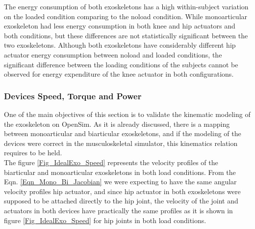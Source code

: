 \documentclass[10pt,letterpaper]{article}
\begin{document}
The energy consumption of both exoskeletons has a high within-subject variation on the loaded condition comparing to the noload condition. While monoarticular exoskeleton had less energy consumption in both knee and hip actuators and both conditions, but these differences are not statistically significant between the two exoskeletons.  Although both exoskeletons have considerably different hip actuator energy consumption between noload and loaded conditions, the significant difference between the loading conditions of the subjects cannot be observed for energy expenditure of the knee actuator in both configurations.\\
\subsubsection*{Devices Speed, Torque and Power}
One of the main objectives of this section is to validate the kinematic modeling of the exoskeleton on OpenSim. As it is already discussed, there is a mapping between monoarticular and biarticular exoskeletons, and if the modeling of the devices were correct in the musculoskeletal simulator, this kinematics relation requires to be held.\\
The figure \ref{Fig_IdealExo_Speed} represents the velocity profiles of the biarticular and monoarticular exoskeletons in both load conditions. From the Eqn. \ref{Eqn_Mono_Bi_Jacobian} we were expecting to have the same angular velocity profiles hip actuator, and since hip actuator in both exoskeletons were supposed to be attached directly to the hip joint, the velocity of the joint and actuators in both devices have practically the same profiles as it is shown in figure \ref{Fig_IdealExo_Speed}  for hip joints in both load conditions.\\
\end{document}

